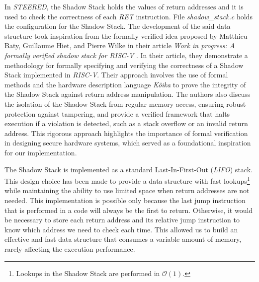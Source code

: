 In \textit{STEERED}, the Shadow Stack holds the values of return addresses and
it is used to check the correctness of each \textit{RET} instruction. File
\textit{shadow\_stack.c} holds the configuration for the Shadow Stack. The
development of the said data structure took inspiration from the formally
verified idea proposed by Matthieu Baty, Guillaume Hiet, and Pierre Wilke in
their article \textit{Work in progress: A formally verified shadow stack for RISC-V}
\cite{shadowstack}. In their article, they demonstrate a methodology for formally
specifying and verifying the correctness of a Shadow Stack implemented in \textit{RISC-V}.
Their approach involves the use of formal methods and the hardware description language
\textit{Kôika}\cite{koika} to prove the integrity of the Shadow Stack against return
address manipulation. The authors also discuss the isolation of the Shadow Stack
from regular memory access, ensuring robust protection against tampering, and
provide a verified framework that halts execution if a violation is detected, such
as a stack overflow or an invalid return address. This rigorous approach
highlights the importance of formal verification in designing secure hardware
systems, which served as a foundational inspiration for our implementation.

The Shadow Stack is implemented as a standard Last-In-First-Out (\textit{LIFO})
stack. This design choice has been made to provide a data structure with fast lookups\footnote{Lookups
in the Shadow Stack are performed in $\mathcal{O}(1)$.} while maintaining the
ability to use limited space when return addresses are not needed. This implementation
is possible only because the last jump instruction that is performed in a code will
always be the first to return. Otherwise, it would be necessary to store each return
address and its relative jump instruction to know which address we need to check
each time. This allowed us to build an effective and fast data structure that
consumes a variable amount of memory, rarely affecting the execution performance.


